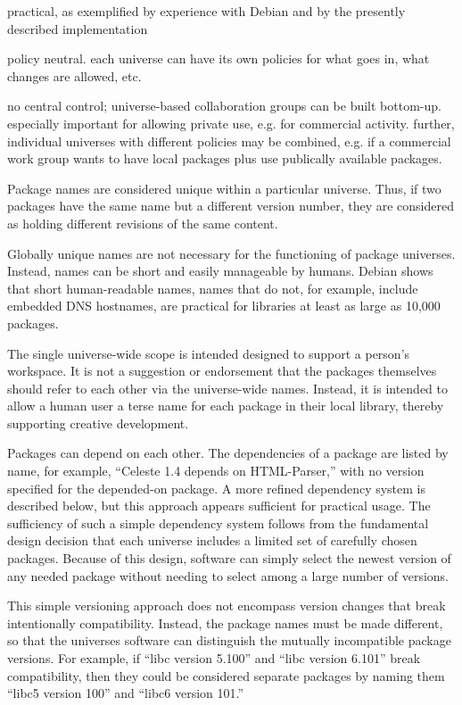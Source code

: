 \documentclass{article}
\begin{document}
  practical, as exemplified by experience with Debian and by
  the presently described implementation

  policy neutral.  each universe can have its own policies for
  what goes in, what changes are allowed, etc.

  no central control; universe-based collaboration groups
  can be built bottom-up.  especially important for allowing
  private use, e.g. for commercial activity.  further, individual
  universes with different policies may be combined, e.g. if a
  commercial work group wants to have local packages plus use
  publically available packages.
   

Package names are considered unique within a particular universe.
Thus, if two packages have the same name but a different version
number, they are considered as holding different revisions of the same
content.

Globally unique names are not necessary for the functioning of package
universes.  Instead, names can be short and easily manageable by
humans.  Debian shows that short human-readable names, names that do
not, for example, include embedded DNS hostnames, are practical for
libraries at least as large as 10,000 packages.

The single universe-wide scope is intended designed to support a
person's workspace. It is not a suggestion or endorsement that the
packages themselves should refer to each other via the universe-wide
names.  Instead, it is intended to allow a human user a terse name for
each package in their local library, thereby supporting creative
development.


Packages can depend on each other.  The dependencies of a package are
listed by name, for example, ``Celeste 1.4 depends on HTML-Parser,''
with no version specified for the depended-on package.  A more refined
dependency system is described below, but this approach appears
sufficient for practical usage.  The sufficiency of such a simple
dependency system follows from the fundamental design decision that
each universe includes a limited set of carefully chosen packages.
Because of this design, software can simply select the newest version
of any needed package without needing to select among a large number
of versions.

This simple versioning approach does not encompass version changes
that break intentionally compatibility.  Instead, the package names
must be made different, so that the universes software can distinguish
the mutually incompatible package versions.  For example, if ``libc
version 5.100'' and ``libc version 6.101'' break compatibility, then
they could be considered separate packages by naming them ``libc5
version 100'' and ``libc6 version 101.''
\end{document}
